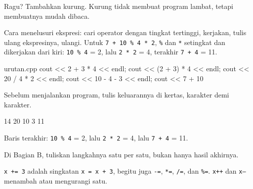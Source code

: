 \documentclass[a4paper]{article}
\begin{document}
\par\vspace{4pt}\par\vspace{6pt}
\begin{Penting}[]
Ragu? Tambahkan kurung. Kurung tidak membuat program lambat, tetapi membuatnya mudah dibaca.
\end{Penting}
Cara menelusuri ekspresi: cari operator dengan tingkat tertinggi, kerjakan, tulis ulang ekspresinya, ulangi. Untuk \texttt{7 + 10 \% 4 * 2}, \texttt{\%} dan \texttt{*} setingkat dan dikerjakan dari kiri: \texttt{10 \% 4} = 2, lalu \texttt{2 * 2} = 4, terakhir \texttt{7 + 4} = 11.

\begin{MKode}{urutan.cpp}
cout << 2 + 3 * 4 << endl;
cout << (2 + 3) * 4 << endl;
cout << 20 / 4 * 2 << endl;
cout << 10 - 4 - 3 << endl;
cout << 7 + 10 %
\end{MKode}
\begin{Tebak}[]
Sebelum menjalankan program, tulis keluarannya di kertas, karakter demi karakter.
\end{Tebak}
\begin{Jawaban}[]
\begin{MKeluaran}[]
14
20
10
3
11
\end{MKeluaran}
Baris terakhir: \texttt{10 \% 4} = 2, lalu \texttt{2 * 2} = 4, lalu \texttt{7 + 4} = 11.
\end{Jawaban}
\begin{Penting}[]
Di Bagian B, tuliskan langkahnya satu per satu, bukan hanya hasil akhirnya.
\end{Penting}
\texttt{x += 3} adalah singkatan \texttt{x = x + 3}, begitu juga \texttt{-=}, \texttt{*=}, \texttt{/=}, dan \texttt{\%=}. \texttt{x++} dan \texttt{x--} menambah atau mengurangi satu.
\end{document}
